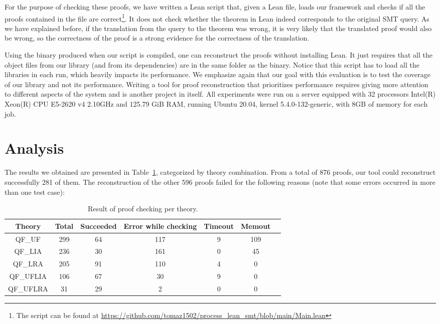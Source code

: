 For the purpose of checking these proofs, we have written a Lean script that, given
a Lean file, loads our framework and checks if all the proofs contained in the file
are correct\footnote{The script can
  be found at \url{https://github.com/tomaz1502/process_lean_smt/blob/main/Main.lean}}.
%
It does not check whether the theorem in Lean indeed corresponds to the original SMT query.
%
As we have explained before, if the translation from the query to the theorem was wrong,
it is very likely that the translated proof would also be wrong, so the correctness
of the proof is a strong evidence for the correctness of the translation.

Using the binary produced when our script is compiled, one can reconstruct the
proofs without installing Lean.
%
It just requires that all the object files from our library (and from its dependencies)
are in the same folder as the binary.
%
Notice that this script has to load all the libraries in each run, which heavily impacts
its performance.
%
We emphasize again that our goal with this evaluation is to test the coverage of our
library and not its performance.
%
Writing a tool for proof reconstruction that prioritizes performance requires
giving more attention to different aspects of the system and is another
project in itself.
%
All experiments were run on a server equipped with 32 processors Intel(R) Xeon(R)
CPU E5-2620 v4 2.10GHz and 125.79 GiB RAM, running Ubuntu 20.04,
kernel 5.4.0-132-generic, with 8GB of memory for each job.

\section{Analysis}

The results we obtained are presented in Table~\ref{results_rcons}, categorized
by theory combination. From a total of 876 proofs, our tool could reconstruct
successfully 281 of them. The reconstruction of the other 596 proofs
failed for the following reasons (note that some errors occurred in more than one test case):

\begin{table}[t]
\centering
\begin{tabular}{ c c c c c c c }
\toprule
Theory  & Total   & Succeeded & Error while checking & Timeout & Memout \\ \midrule
QF\_UF    & 299   & 64    & 117     & 9       & 109  \\ \midrule
QF\_LIA   & 236   & 30    & 161     & 0       & 45   \\ \midrule
QF\_LRA   & 205   & 91    & 110     & 4       & 0    \\ \midrule
QF\_UFLIA & 106   & 67    & 30      & 9       & 0    \\ \midrule
QF\_UFLRA & 31    & 29    & 2       & 0       & 0    \\ \bottomrule
\end{tabular}
\caption{Result of proof checking per theory.}\label{results_rcons}
\end{table}


